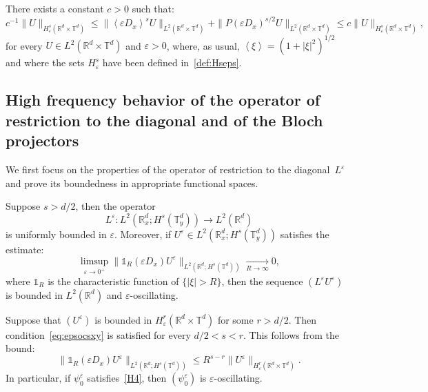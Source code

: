 \documentclass[AHL,Unicode,longabstracts]{cedram}
\newcommand*\R{{\mathbb R}}
\newcommand*\T{{\mathbb T}}
\newcommand*\eps{\varepsilon}
\newcommand{\To}{\longrightarrow}
\numberwithin{equation}{section}
\def\Tend#1#2{\mathop{\longrightarrow}\limits_{#1\rightarrow#2}}
\begin{document}
\begin{rema}\label{rem:eqnorm}
There exists a constant $c>0$ such that:
\[
c^{-1}\|U\|_{H^s_\eps(\R^d\times\T^d)}\leq \lVert\left\langle\eps D_x\right\rangle^s U\|_{L^2(\R^d\times\T^d)}+\|P(\eps D_x)^{s/2}U\|_{L^2(\R^d\times\T^d)}
\leq c\|U\|_{H^s_\eps(\R^d\times\T^d)},
\]%
for every $U\in L^2(\R^d\times\T^d)$ and $\eps>0$, where, as usual, $\left\langle\xi\right\rangle=(1+|\xi|^2)^{1/2}$ and where the sets $H^s_\eps$ have been defined in~\eqref{def:Hseps}.
\end{rema}

\subsection{High frequency behavior of the operator of restriction to the diagonal and of the Bloch projectors}
We first focus on the properties of the operator of restriction to the diagonal~$L^\eps$ and prove its boundedness in appropriate functional spaces.

\begin{lemm}\label{lem:eoscxy}
Suppose $s>d/2$, then the operator
\[
L^\eps: L^2(\R^d_x;H^s(\T^d_y))\To L^2(\R^d)
\]
is uniformly bounded in $\eps$. 
Moreover, if $U^\eps\in L^2(\R^d_x;H^s(\T^d_y))$ satisfies the estimate:
\begin{equation}\label{eq:epsocsxy}
\limsup_{\eps\to 0^+}\|\mathds{1}_R(\eps D_x)U^\eps\|_{L^2(\R^d;H^s(\T^d))}\Tend{R}{\infty}0,
\end{equation}
where $\mathds{1}_R$ is the characteristic function of $\{|\xi|>R\}$, then the sequence $(L^\eps U^\eps)$ is bounded in $L^2(\R^d)$ and $\eps$-oscillating.
\end{lemm}

\begin{rema}\label{rem:psieps0epsosc}
Suppose that $(U^\eps)$ is bounded in $H^r_\eps(\R^d\times\T^d)$ for some $r>d/2$. Then condition~\eqref{eq:epsocsxy} is satisfied for every $d/2<s<r$. This follows from the bound:
\[
\|\mathds{1}_R(\eps D_x)U^\eps\|_{L^2(\R^d;H^s(\T^d))}\leq R^{s-r}\|U^\eps\|_{H^r_\eps(\R^d\times\T^d)}.
\]
In particular, if $\psi^\eps_0$ satisfies~\eqref{H4}, then $(\psi^\eps_0)$ is $\eps$-oscillating.
\end{rema}
\end{document}
